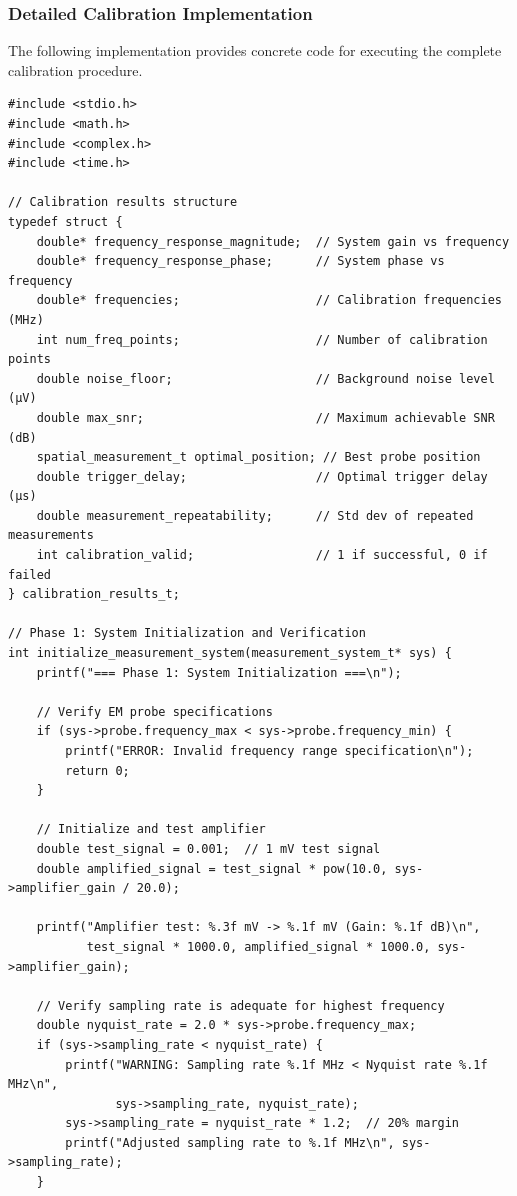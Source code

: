 \documentclass[11pt,a4paper]{article}
\theoremstyle{definition}
\begin{document}
\subsubsection{Detailed Calibration Implementation}

The following implementation provides concrete code for executing the complete calibration procedure.

\begin{lstlisting}[caption={Complete EM Calibration Implementation}]
#include <stdio.h>
#include <math.h>
#include <complex.h>
#include <time.h>

// Calibration results structure
typedef struct {
    double* frequency_response_magnitude;  // System gain vs frequency
    double* frequency_response_phase;      // System phase vs frequency
    double* frequencies;                   // Calibration frequencies (MHz)
    int num_freq_points;                   // Number of calibration points
    double noise_floor;                    // Background noise level (μV)
    double max_snr;                        // Maximum achievable SNR (dB)
    spatial_measurement_t optimal_position; // Best probe position
    double trigger_delay;                  // Optimal trigger delay (μs)
    double measurement_repeatability;      // Std dev of repeated measurements
    int calibration_valid;                 // 1 if successful, 0 if failed
} calibration_results_t;

// Phase 1: System Initialization and Verification
int initialize_measurement_system(measurement_system_t* sys) {
    printf("=== Phase 1: System Initialization ===\n");
    
    // Verify EM probe specifications
    if (sys->probe.frequency_max < sys->probe.frequency_min) {
        printf("ERROR: Invalid frequency range specification\n");
        return 0;
    }
    
    // Initialize and test amplifier
    double test_signal = 0.001;  // 1 mV test signal
    double amplified_signal = test_signal * pow(10.0, sys->amplifier_gain / 20.0);
    
    printf("Amplifier test: %.3f mV -> %.1f mV (Gain: %.1f dB)\n", 
           test_signal * 1000.0, amplified_signal * 1000.0, sys->amplifier_gain);
    
    // Verify sampling rate is adequate for highest frequency
    double nyquist_rate = 2.0 * sys->probe.frequency_max;
    if (sys->sampling_rate < nyquist_rate) {
        printf("WARNING: Sampling rate %.1f MHz < Nyquist rate %.1f MHz\n",
               sys->sampling_rate, nyquist_rate);
        sys->sampling_rate = nyquist_rate * 1.2;  // 20% margin
        printf("Adjusted sampling rate to %.1f MHz\n", sys->sampling_rate);
    }
    

\end{lstlisting}
\end{document}
